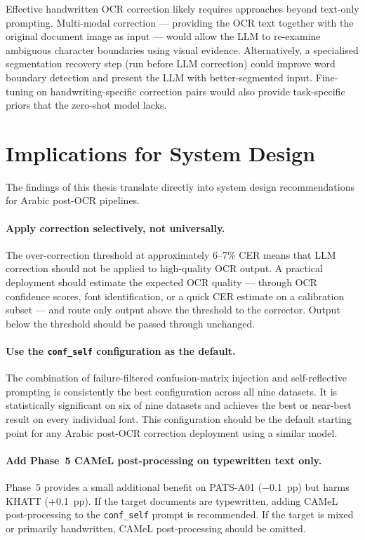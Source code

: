 Effective handwritten OCR correction likely requires approaches beyond
text-only prompting. Multi-modal correction --- providing the OCR text
together with the original document image as input --- would allow the LLM
to re-examine ambiguous character boundaries using visual evidence. Alternatively,
a specialised segmentation recovery step (run before LLM correction) could
improve word boundary detection and present the LLM with better-segmented
input. Fine-tuning on handwriting-specific correction pairs would also
provide task-specific priors that the zero-shot model lacks.

\section{Implications for System Design}
\label{sec:disc_design}

The findings of this thesis translate directly into system design
recommendations for Arabic post-OCR pipelines.

\paragraph{Apply correction selectively, not universally.}
The over-correction threshold at approximately 6--7\% CER means that LLM
correction should not be applied to high-quality OCR output. A practical
deployment should estimate the expected OCR quality --- through OCR confidence
scores, font identification, or a quick CER estimate on a calibration subset
--- and route only output above the threshold to the corrector. Output below
the threshold should be passed through unchanged.

\paragraph{Use the \texttt{conf\_self} configuration as the default.}
The combination of failure-filtered confusion-matrix injection and
self-reflective prompting is consistently the best configuration across all
nine datasets. It is statistically significant on six of nine datasets and
achieves the best or near-best result on every individual font. This
configuration should be the default starting point for any Arabic post-OCR
correction deployment using a similar model.

\paragraph{Add Phase~5 CAMeL post-processing on typewritten text only.}
Phase~5 provides a small additional benefit on PATS-A01 ($-$0.1~pp) but
harms KHATT ($+$0.1~pp). If the target documents are typewritten, adding
CAMeL post-processing to the \texttt{conf\_self} prompt is recommended.
If the target is mixed or primarily handwritten, CAMeL post-processing
should be omitted.

